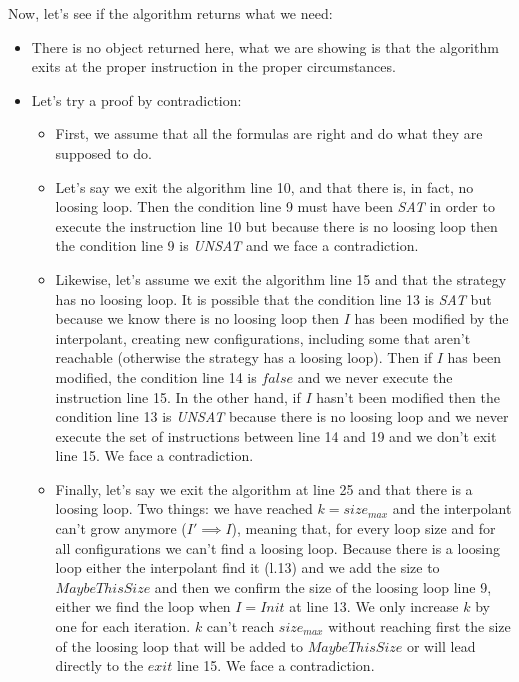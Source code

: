 \documentclass{article}
\begin{document}
\noindent Now, let's see if the algorithm returns what we need:
\begin{itemize}
    \item There is no object returned here, what we are showing is that the algorithm exits at the proper instruction in the proper circumstances.
    \item Let's try a proof by contradiction:
    \begin{itemize}
        \item First, we assume that all the formulas are right and do what they are supposed to do.
        \item Let's say we exit the algorithm line 10, and that there is, in fact, no loosing loop. Then the condition line 9 must have been \textit{SAT} in order to execute the instruction line 10 but because there is no loosing loop then the condition line 9 is \textit{UNSAT} and we face a contradiction.
        \item Likewise, let's assume we exit the algorithm line 15 and that the strategy has no loosing loop. It is possible that the condition line 13 is \textit{SAT} but because we know there is no loosing loop then $I$ has been modified by the interpolant, creating new configurations, including some that aren't reachable  (otherwise the strategy has a loosing loop). Then if $I$ has been modified, the condition line 14 is $false$ and we never execute the instruction line 15. In the other hand, if $I$ hasn't been modified then the condition line 13 is \textit{UNSAT} because there is no loosing loop and we never execute the set of instructions between line 14 and 19 and we don't exit line 15. We face a contradiction.
        \item Finally, let's say we exit the algorithm at line 25 and that there is a loosing loop. Two things: we have reached $k = size_{max}$ and the interpolant can't grow anymore  ($I' \implies I$), meaning that, for every loop size and for all configurations we can't find a loosing loop. Because there is a loosing loop either the interpolant find it  (l.13) and we add the size to $MaybeThisSize$ and then we confirm the size of the loosing loop line 9, either we find the loop when $I = Init$ at line 13. We only increase $k$ by one for each iteration. $k$ can't reach $size_{max}$ without reaching first the size of the loosing loop that will be added to $MaybeThisSize$ or will lead directly to the $exit$ line 15. We face a contradiction.
    \end{itemize}
\end{itemize}
\newpage
\end{document}
